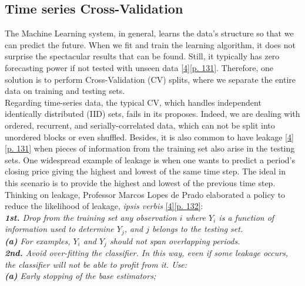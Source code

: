 \subsection{Time series Cross-Validation}
\label{chap:Time series Cross-Validation}

\quad The Machine Learning system, in general, learns the data's structure so that we can predict the future. When we fit and train the learning algorithm, it does not surprise the spectacular results that can be found. Still, it typically has zero forecasting power if not tested with unseen data \hyperref[Bib:Lopez de Prado]{[4][p. 131]}. Therefore, one solution is to perform Cross-Validation (CV) splits, where we separate the entire data on training and testing sets.\\

Regarding time-series data, the typical CV, which handles independent identically distributed (IID) sets, fails in its proposes. Indeed, we are dealing with ordered, recurrent, and serially-correlated data, which can not be split into unordered blocks or even shuffled. Besides, it is also common to have leakage \hyperref[Bib:Lopez de Prado]{[4][p. 131]} when pieces of information from the training set also arise in the testing sets. One widespread example of leakage is when one wants to predict a period's closing price giving the highest and lowest of the same time step. The ideal in this scenario is to provide the highest and lowest of the previous time step. Thinking on leakage, Professor Marcos Lopes de Prado elaborated a policy to reduce the likelihood of leakage, \textit{ipsis verbis} \hyperref[Bib:Lopez de Prado]{[4][p. 132]}:\\

\noindent \textit{\textbf{1st.} Drop from the training set any observation $i$ where $Y_i$ is a function of information used to determine $Y_j$, and $j$ belongs to the testing set.}\\

\qquad \textit{\textbf{(a)} For examples, $Y_i$ and $Y_j$ should not span overlapping periods.}\\

\noindent \textit{\textbf{2nd.} Avoid over-fitting the classifier. In this way, even if some leakage occurs, the classifier will not be able to profit from it. Use:}\\

\qquad \textit{\textbf{(a)} Early stopping of the base estimators;}\\

